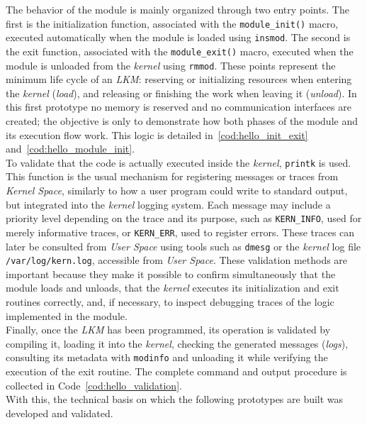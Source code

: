 The behavior of the module is mainly organized through two entry points.
The first is the initialization function, associated with the \texttt{module\_init()} macro, executed automatically when the module is loaded using \texttt{insmod}.
The second is the exit function, associated with the \texttt{module\_exit()} macro, executed when the module is unloaded from the \textit{kernel} using \texttt{rmmod}.
These points represent the minimum life cycle of an \textit{LKM}: reserving or initializing resources when entering the \textit{kernel} (\textit{load}), and releasing or finishing the work when leaving it (\textit{unload}).
In this first prototype no memory is reserved and no communication interfaces are created; the objective is only to demonstrate how both phases of the module and its execution flow work.
This logic is detailed in~\ref{cod:hello_init_exit} and~\ref{cod:hello_module_init}.\\

To validate that the code is actually executed inside the \textit{kernel}, \texttt{printk} is used.
This function is the usual mechanism for registering messages or traces from \textit{Kernel Space}, similarly to how a user program could write to standard output, but integrated into the \textit{kernel} logging system.
Each message may include a priority level depending on the trace and its purpose, such as \texttt{KERN\_INFO}, used for merely informative traces, or \texttt{KERN\_ERR}, used to register errors.
These traces can later be consulted from \textit{User Space} using tools such as \texttt{dmesg} or the \textit{kernel} log file \texttt{/var/log/kern.log}, accessible from \textit{User Space}.
These validation methods are important because they make it possible to confirm simultaneously that the module loads and unloads, that the \textit{kernel} executes its initialization and exit routines correctly, and, if necessary, to inspect debugging traces of the logic implemented in the module.\\

Finally, once the \textit{LKM} has been programmed, its operation is validated by compiling it, loading it into the \textit{kernel}, checking the generated messages (\textit{logs}), consulting its metadata with \texttt{modinfo} and unloading it while verifying the execution of the exit routine.
The complete command and output procedure is collected in Code~\ref{cod:hello_validation}.\\

With this, the technical basis on which the following prototypes are built was developed and validated.\\\\

